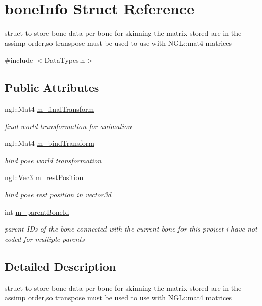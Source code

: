 \hypertarget{structbone_info}{\section{bone\-Info Struct Reference}
\label{structbone_info}
}


struct to store bone data per bone for skinning the matrix stored are in the assimp order,so transpose must be used to use with N\-G\-L\-::mat4 matrices  




{\ttfamily \#include $<$Data\-Types.\-h$>$}

\subsection*{Public Attributes}
\begin{DoxyCompactItemize}
\item 
ngl\-::\-Mat4 \hyperlink{structbone_info_a9ce75c67a0531088b753748b1a0d662f}{m\-\_\-final\-Transform}
\begin{DoxyCompactList}\small\item\em final world transformation for animation \end{DoxyCompactList}\item 
ngl\-::\-Mat4 \hyperlink{structbone_info_a76b97b00a65fcc7f0da632b4482f2736}{m\-\_\-bind\-Transform}
\begin{DoxyCompactList}\small\item\em bind pose world transformation \end{DoxyCompactList}\item 
ngl\-::\-Vec3 \hyperlink{structbone_info_aa1d6e7a3b0575366ff7927f6087fe204}{m\-\_\-rest\-Position}
\begin{DoxyCompactList}\small\item\em bind pose rest position in vector3d \end{DoxyCompactList}\item 
int \hyperlink{structbone_info_a6658fd0f8b4d914039cb6c1e21a59d33}{m\-\_\-parent\-Bone\-Id}
\begin{DoxyCompactList}\small\item\em parent I\-Ds of the bone connected with the current bone for this project i have not coded for multiple parents \end{DoxyCompactList}\end{DoxyCompactItemize}


\subsection{Detailed Description}
struct to store bone data per bone for skinning the matrix stored are in the assimp order,so transpose must be used to use with N\-G\-L\-::mat4 matrices 

